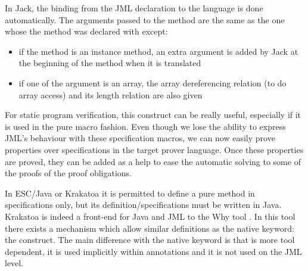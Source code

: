 In Jack, the binding from the JML declaration to the  language is done automatically.
The arguments passed to the method are the same as the one whose the method was declared with
except:
\begin{itemize}
\item if the method is an instance method, an extra argument  is added by Jack 
  at the beginning of the method when it is translated
\item if one of the argument is an array, the array dereferencing relation
(to do array access) and its length relation are also given
\end{itemize}


For static program verification, this construct can be really useful, especially if 
it is used in the pure macro fashion. 
Even though we lose the ability to express JML's behaviour
with these specification macros, 
we can now easily prove properties over specifications in the target prover language. 
Once these properties are proved, they can be added as a help
to ease the automatic solving to some of the proofs of the proof obligations.

In  ESC/Java or Krakatoa it is permitted to define a pure method in
specifications only, but its definition/specifications must be written in Java.
Krakatoa is indeed a front-end for Java and JML to the Why tool \cite{Why-Tool}. 
In this tool there exists a mechanism 
which allow similar definitions as the native keyword: the  construct.
The main difference with the native keyword is that  is more tool dependent, 
 it is used implicitly within annotations and it is not used on the JML level.


